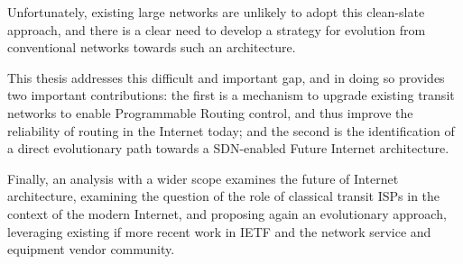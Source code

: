 
Unfortunately, existing large networks are unlikely to adopt this clean-slate approach, and there is a clear need to develop a strategy for evolution from conventional networks towards such an architecture.

This thesis addresses this difficult and important gap, and in doing so provides two important contributions: the first is a mechanism to upgrade existing transit networks to enable Programmable Routing control, and thus improve the reliability of routing in the Internet today; and the second is the identification of a direct evolutionary path towards a SDN-enabled Future Internet architecture.

Finally, an analysis with a wider scope examines the future of Internet architecture, examining the question of the role of classical transit ISPs in the context of the modern Internet, and proposing again an evolutionary approach, leveraging existing if more recent work in IETF and the network service and equipment vendor community. 
